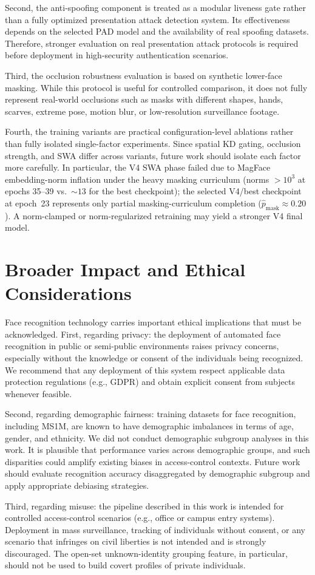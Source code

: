 Second, the anti-spoofing component is treated as a modular liveness gate rather than a fully optimized presentation attack detection system. Its effectiveness depends on the selected PAD model and the availability of real spoofing datasets. Therefore, stronger evaluation on real presentation attack protocols is required before deployment in high-security authentication scenarios.

Third, the occlusion robustness evaluation is based on synthetic lower-face masking. While this protocol is useful for controlled comparison, it does not fully represent real-world occlusions such as masks with different shapes, hands, scarves, extreme pose, motion blur, or low-resolution surveillance footage.

Fourth, the training variants are practical configuration-level ablations rather than fully isolated single-factor experiments. Since spatial KD gating, occlusion strength, and SWA differ across variants, future work should isolate each factor more carefully. In particular, the V4 SWA phase failed due to MagFace embedding-norm inflation under the heavy masking curriculum (norms $>10^3$ at epochs 35--39 vs.\ $\sim\!13$ for the best checkpoint); the selected V4/best checkpoint at epoch~23 represents only partial masking-curriculum completion ($\hat{p}_{\text{mask}}\approx0.20$). A norm-clamped or norm-regularized retraining may yield a stronger V4 final model.

\section{Broader Impact and Ethical Considerations}

Face recognition technology carries important ethical implications that must be acknowledged. First, regarding privacy: the deployment of automated face recognition in public or semi-public environments raises privacy concerns, especially without the knowledge or consent of the individuals being recognized. We recommend that any deployment of this system respect applicable data protection regulations (e.g., GDPR) and obtain explicit consent from subjects whenever feasible.

Second, regarding demographic fairness: training datasets for face recognition, including MS1M, are known to have demographic imbalances in terms of age, gender, and ethnicity. We did not conduct demographic subgroup analyses in this work. It is plausible that performance varies across demographic groups, and such disparities could amplify existing biases in access-control contexts. Future work should evaluate recognition accuracy disaggregated by demographic subgroup and apply appropriate debiasing strategies.

Third, regarding misuse: the pipeline described in this work is intended for controlled access-control scenarios (e.g., office or campus entry systems). Deployment in mass surveillance, tracking of individuals without consent, or any scenario that infringes on civil liberties is not intended and is strongly discouraged. The open-set unknown-identity grouping feature, in particular, should not be used to build covert profiles of private individuals.